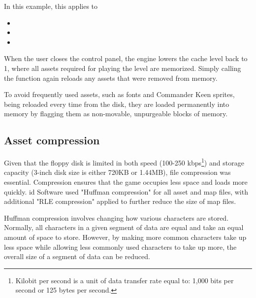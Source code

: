 \documentclass[book.tex]{subfiles}
\begin{document}
\bigskip
\par
In this example, this applies to 
\begin{itemize}
  \item {}
  \item {}
  \item {} 
\end{itemize}





\par
When the user closes the control panel, the engine lowers the cache level back to 1, where all assets required for playing the level are memorized. Simply calling the function  again reloads any assets that were removed from memory.\\

\pagebreak

\par
To avoid frequently used assets, such as fonts and Commander Keen sprites, being reloaded every time from the disk, they are loaded permanently into memory by flagging them as non-movable, unpurgeable blocks of memory. \\

\par

\par
 
\subsection{Asset compression}
Given that the floppy disk is limited in both speed (100-250 kbps\footnote{Kilobit per second is a unit of data transfer rate equal to: 1,000 bits per second or 125 bytes per second.}) and storage capacity (3-inch disk size is either 720KB or 1.44MB), file compression was essential. Compression ensures that the game occupies less space and loads more quickly. id Software used "Huffman compression" for all asset and map files, with additional "RLE compression" applied to further reduce the size of map files.\\


\par
Huffman compression involves changing how various characters are stored. Normally, all characters in a given segment of data are equal and take an equal amount of space to store. However, by making more common characters take up less space while allowing less commonly used characters to take up more, the overall size of a segment of data can be reduced. \\
\end{document}
